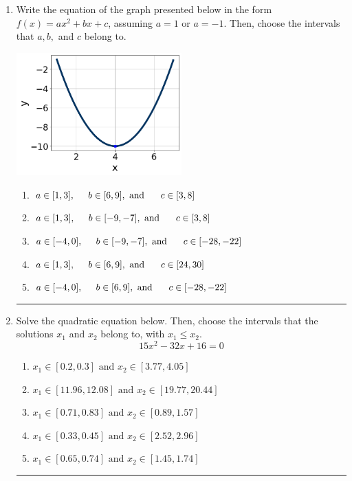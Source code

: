 \documentclass[14pt]{extbook}
\newcommand{\litem}[1]{\item#1\hspace*{-1cm}\rule{\textwidth}{0.4pt}}
\begin{document}
\begin{enumerate}
{\begin{enumerate}[label=\Alph*.]
\end{enumerate} }
\litem{
Write the equation of the graph presented below in the form $f(x)=ax^2+bx+c$, assuming  $a=1$ or $a=-1$. Then, choose the intervals that $a, b,$ and $c$ belong to.
\begin{center}
    \includegraphics[width=0.5\textwidth]{../Figures/quadraticGraphToEquationCopyC.png}
\end{center}
\begin{enumerate}[label=\Alph*.]
\item \( a \in [1, 3], \hspace*{5mm} b \in [6, 9], \text{ and } \hspace*{5mm} c \in [3, 8] \)
\item \( a \in [1, 3], \hspace*{5mm} b \in [-9, -7], \text{ and } \hspace*{5mm} c \in [3, 8] \)
\item \( a \in [-4, 0], \hspace*{5mm} b \in [-9, -7], \text{ and } \hspace*{5mm} c \in [-28, -22] \)
\item \( a \in [1, 3], \hspace*{5mm} b \in [6, 9], \text{ and } \hspace*{5mm} c \in [24, 30] \)
\item \( a \in [-4, 0], \hspace*{5mm} b \in [6, 9], \text{ and } \hspace*{5mm} c \in [-28, -22] \)

\end{enumerate} }
\litem{
Solve the quadratic equation below. Then, choose the intervals that the solutions $x_1$ and $x_2$ belong to, with $x_1 \leq x_2$.\[ 15x^{2} -32 x + 16 = 0 \]\begin{enumerate}[label=\Alph*.]
\item \( x_1 \in [0.2, 0.3] \text{ and } x_2 \in [3.77, 4.05] \)
\item \( x_1 \in [11.96, 12.08] \text{ and } x_2 \in [19.77, 20.44] \)
\item \( x_1 \in [0.71, 0.83] \text{ and } x_2 \in [0.89, 1.57] \)
\item \( x_1 \in [0.33, 0.45] \text{ and } x_2 \in [2.52, 2.96] \)
\item \( x_1 \in [0.65, 0.74] \text{ and } x_2 \in [1.45, 1.74] \)


\end{enumerate}}
\end{enumerate}
\end{document}
